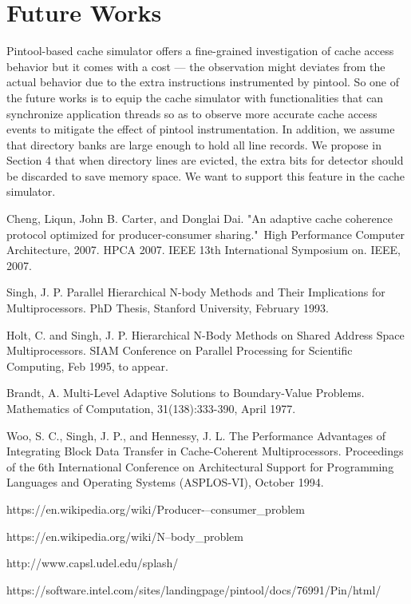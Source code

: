 \documentclass[11pt,conference]{IEEEtran}
\begin{document}
\section{Future Works}

Pintool-based \cite{pintool} cache simulator offers a fine-grained investigation of cache access behavior but it comes with a cost --- the observation might deviates from the actual behavior due to the extra instructions instrumented by pintool. So one of the future works is to equip the cache simulator with functionalities that can synchronize application threads so as to observe more accurate cache access events to mitigate the effect of pintool instrumentation. In addition, we assume that directory banks are large enough to hold all line records. We propose in Section 4 that when directory lines are evicted, the extra bits for detector should be discarded to save memory space. We want to support this feature in the cache simulator.

\begin{thebibliography}{1}

Cheng, Liqun, John B. Carter, and Donglai Dai. "An adaptive cache coherence protocol optimized for producer-consumer sharing." High Performance Computer Architecture, 2007. HPCA 2007. IEEE 13th International Symposium on. IEEE, 2007.

Singh, J. P.  Parallel Hierarchical N-body Methods and Their Implications for Multiprocessors.  PhD Thesis, Stanford University, February 1993.

Holt, C. and Singh, J. P.  Hierarchical N-Body Methods on Shared Address Space Multiprocessors.  SIAM Conference on Parallel Processing for Scientific Computing, Feb 1995, to appear.

Brandt, A. Multi-Level Adaptive Solutions to Boundary-Value Problems. Mathematics of Computation, 31(138):333-390, April 1977.

Woo, S. C., Singh, J. P., and Hennessy, J. L.  The Performance Advantages of Integrating Block Data Transfer in Cache-Coherent Multiprocessors. Proceedings of the 6th International Conference on Architectural Support for Programming Languages and Operating Systems (ASPLOS-VI), October 1994.

https://en.wikipedia.org/wiki/Producer-–consumer\_problem

https://en.wikipedia.org/wiki/N--body\_problem

http://www.capsl.udel.edu/splash/

https://software.intel.com/sites/landingpage/pintool/docs/76991/Pin/html/

\end{thebibliography}
\end{document}
